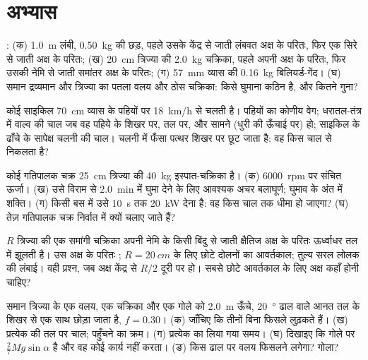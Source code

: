 \section{अभ्यास}

\begin{exercise}[$\star$]\label{exo:b2:rigid-body-mechanics:1}
: (क) \qty{1.0}{m} लंबी, \qty{0.50}{kg} की छड़, पहले उसके
केंद्र से जाती लंबवत अक्ष के परितः, फिर एक सिरे से जाती अक्ष के परितः;
(ख) \qty{20}{cm} त्रिज्या की \qty{2.0}{kg} चक्रिका, पहले अपनी अक्ष के
परितः, फिर उसकी नेमि से जाती समांतर अक्ष के परितः; (ग) \qty{57}{mm}
व्यास की \qty{0.16}{kg} बिलियर्ड-गेंद। (घ) समान द्रव्यमान और त्रिज्या का
पतला वलय और ठोस चक्रिका: किसे घुमाना कठिन है, और कितने गुना?
\end{exercise}

\begin{exercise}[$\star$]\label{exo:b2:rigid-body-mechanics:2}
कोई साइकिल \qty{70}{cm} व्यास के पहियों पर \qty{18}{km/h} से चलती है।
पहियों का कोणीय वेग; धरातल-तंत्र में वाल्व की चाल जब वह पहिये के शिखर
पर, तल पर, और सामने (धुरी की ऊँचाई पर) हो; साइकिल के ढाँचे के सापेक्ष
चलनी की चाल। चलनी में फँसा पत्थर शिखर पर छूट जाता है: वह किस चाल से
निकलता है?
\end{exercise}

\begin{exercise}[$\star$]\label{exo:b2:rigid-body-mechanics:3}
कोई गतिपालक चक्र \qty{25}{cm} त्रिज्या की \qty{40}{kg} इस्पात-चक्रिका है।
(क) \qty{6000}{rpm} पर संचित ऊर्जा। (ख) उसे विराम से \qty{2.0}{min} में
घुमा देने के लिए आवश्यक अचर बलाघूर्ण; घुमाव के अंत में शक्ति। (ग) किसी
बस में उसे \qty{10}{s} तक \qty{20}{kW} देना है: वह किस चाल तक धीमा हो
जाएगा? (घ) तेज़ गतिपालक चक्र निर्वात में क्यों चलाए जाते हैं?
\end{exercise}

\begin{exercise}[$\star$]\label{exo:b2:rigid-body-mechanics:4}
$R$ त्रिज्या की एक समांगी चक्रिका अपनी नेमि के किसी बिंदु से जाती क्षैतिज
अक्ष के परितः ऊर्ध्वाधर तल में झूलती है। उस अक्ष के परितः ;
$R = \qty{20}{cm}$ के लिए छोटे दोलनों का आवर्तकाल; तुल्य सरल लोलक की
लंबाई। वही प्रश्न, जब अक्ष केंद्र से $R/2$ दूरी पर हो। सबसे छोटे
आवर्तकाल के लिए अक्ष कहाँ होनी चाहिए?
\end{exercise}

\begin{exercise}[$\star\star$]\label{exo:b2:rigid-body-mechanics:5}
समान त्रिज्या के एक वलय, एक चक्रिका और एक गोले को \qty{2.0}{m} ऊँचे,
\qty{20}{\degree} ढाल वाले आनत तल के शिखर से एक साथ छोड़ा जाता है, $f =
0.30$। (क) जाँचिए कि तीनों बिना फिसले लुढ़कते हैं। (ख) प्रत्येक की तल पर
चाल; पहुँचने का क्रम। (ग) प्रत्येक का लिया गया समय। (घ) दिखाइए कि गोले पर
 $\tfrac27Mg\sin\alpha$ है और वह कोई कार्य नहीं करता। (ङ) किस ढाल
पर वलय फिसलने लगेगा? गोला?
\end{exercise}

